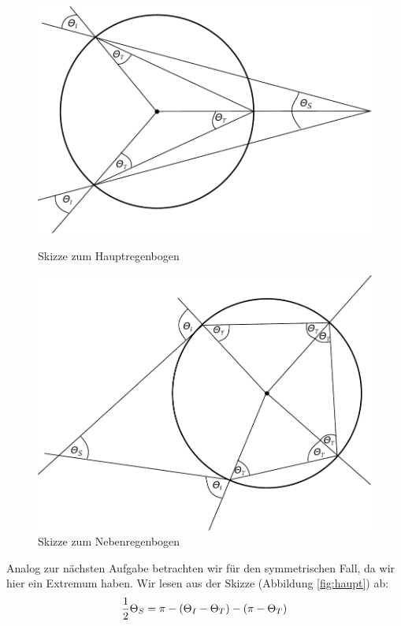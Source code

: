 \documentclass[11pt, ngerman, fleqn]{article}
\newcommand{\half}{\frac 12}
\begin{document}
\begin{figure}
	\centering
	\begin{minipage}[b]{0.49\textwidth}
		\centering
		\includegraphics[width=\textwidth]{H2-Hauptregenbogen.pdf}
		\caption{Skizze zum Hauptregenbogen}
		\label{fig:haupt}
	\end{minipage}
	\begin{minipage}[b]{0.49\textwidth}
		\centering
		\includegraphics[width=\textwidth]{H2-Nebenregenbogen.pdf}
		\caption{Skizze zum Nebenregenbogen}
		\label{fig:neben}
	\end{minipage}
\end{figure}

Analog zur nächsten Aufgabe betrachten wir für den symmetrischen Fall, da wir
hier ein Extremum haben. Wir lesen aus der Skizze (Abbildung \ref{fig:haupt})
ab:
\[
	\half \Theta_S = \pi - \del{\Theta_I - \Theta_T} - \del{\pi - \Theta_T}
\]
\end{document}
